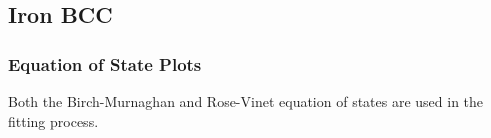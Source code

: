 
\clearpage
\FloatBarrier
\subsection{Iron BCC}





\subsubsection{Equation of State Plots}

Both the Birch-Murnaghan and Rose-Vinet equation of states are used in the fitting process.


